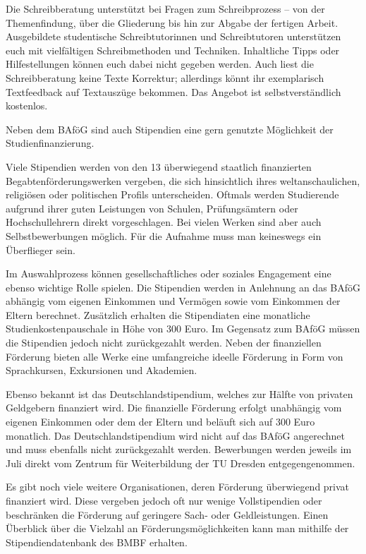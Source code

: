 Die Schreibberatung unterstützt bei Fragen zum Schreibprozess -- von der Themenfindung, über die Gliederung bis hin zur Abgabe der fertigen Arbeit.
Ausgebildete studentische Schreibtutorinnen und Schreibtutoren unterstützen euch mit vielfältigen Schreibmethoden und Techniken.
Inhaltliche Tipps oder Hilfestellungen können euch dabei nicht gegeben werden.
Auch liest die Schreibberatung keine Texte Korrektur; allerdings könnt ihr exemplarisch Textfeedback auf Textauszüge bekommen.
Das Angebot ist selbstverständlich kostenlos.


Neben dem BAföG sind auch Stipendien eine gern genutzte Möglichkeit der Studienfinanzierung.

Viele Stipendien werden von den 13 überwiegend staatlich finanzierten Begabtenförderungswerken vergeben, die sich hinsichtlich ihres weltanschaulichen, religiösen oder politischen Profils unterscheiden.
Oftmals werden Studierende aufgrund ihrer guten Leistungen von Schulen, Prüfungsämtern oder Hochschullehrern direkt vorgeschlagen.
Bei vielen Werken sind aber auch Selbstbewerbungen möglich.
Für die Aufnahme muss man keineswegs ein Überflieger sein.

Im Auswahlprozess können gesellschaftliches oder soziales Engagement eine ebenso wichtige Rolle spielen.
Die Stipendien werden in Anlehnung an das BAföG abhängig vom eigenen Einkommen und Vermögen sowie vom Einkommen der Eltern berechnet.
Zusätzlich erhalten die Stipendiaten eine monatliche Studienkostenpauschale in Höhe von 300 Euro.
Im Gegensatz zum BAföG müssen die Stipendien jedoch nicht zurückgezahlt werden.
Neben der finanziellen Förderung bieten alle Werke eine umfangreiche ideelle Förderung in Form von Sprachkursen, Exkursionen und Akademien.

Ebenso bekannt ist das Deutschlandstipendium, welches zur Hälfte von privaten Geldgebern finanziert wird.
Die finanzielle Förderung erfolgt unabhängig vom eigenen Einkommen oder dem der Eltern und beläuft sich auf 300 Euro monatlich.
Das Deutschlandstipendium wird nicht auf das BAföG angerechnet und muss ebenfalls nicht zurückgezahlt werden.
Bewerbungen werden jeweils im Juli direkt vom Zentrum für Weiterbildung der TU Dresden  entgegengenommen.

Es gibt noch viele weitere Organisationen, deren Förderung überwiegend privat finanziert wird. Diese vergeben jedoch oft nur wenige Vollstipendien oder beschränken die Förderung auf geringere Sach- oder Geldleistungen.
Einen Überblick über die Vielzahl an Förderungsmöglichkeiten kann man mithilfe der Stipendiendatenbank des BMBF  erhalten.

